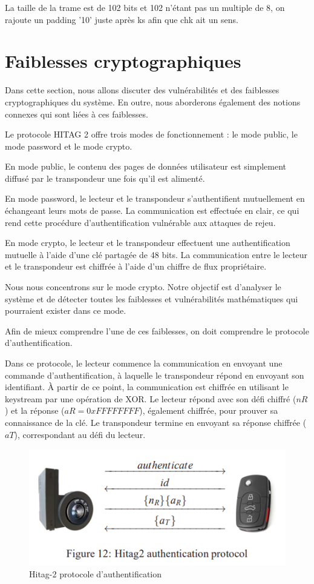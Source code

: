 \documentclass{template}
\begin{document}
La taille de la trame est de 102 bits et 102 n'étant pas un multiple de 8, on rajoute un padding '10' juste après ks afin que chk ait un sens.


\section{Faiblesses cryptographiques}
\baselineskip=16pt
Dans cette section, nous allons discuter des vulnérabilités et des faiblesses cryptographiques du système. En outre, nous aborderons également des notions connexes qui sont liées à ces faiblesses.

Le protocole HITAG 2 offre trois modes de fonctionnement : le mode public, le mode password et le mode crypto.

En mode public, le contenu des pages de données utilisateur est simplement diffusé par le transpondeur une fois qu'il est alimenté.

En mode password, le lecteur et le transpondeur s'authentifient mutuellement en échangeant leurs mots de passe. La communication est effectuée en clair, ce qui rend cette procédure d'authentification vulnérable aux attaques de rejeu.

En mode crypto, le lecteur et le transpondeur effectuent une authentification mutuelle à l'aide d'une clé partagée de 48 bits. La communication entre le lecteur et le transpondeur est chiffrée à l'aide d'un chiffre de flux propriétaire.

Nous nous concentrons sur le mode crypto. Notre objectif est d'analyser le système et de détecter toutes les faiblesses et vulnérabilités mathématiques qui pourraient exister dans ce mode.

Afin de mieux comprendre l'une de ces faiblesses, on doit comprendre le protocole d'authentification.

Dans ce protocole, le lecteur commence la communication en envoyant une commande d'authentification, à laquelle le transpondeur répond en envoyant son identifiant. À partir de ce point, la communication est chiffrée en utilisant le keystream par une opération de XOR. Le lecteur répond avec son défi chiffré (\(nR\)) et la réponse (\(aR = 0xFFFFFFFF\)), également chiffrée, pour prouver sa connaissance de la clé. Le transpondeur termine en envoyant sa réponse chiffrée (\(aT\)), correspondant au défi du lecteur.

\begin{figure}
    \centering
    \includegraphics[width=\textwidth]{Capture.PNG}
    \caption{Hitag-2 protocole d'authentification}
    \label{fig:image}
\end{figure}
\end{document}
